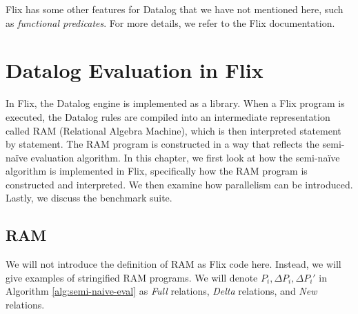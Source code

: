 \documentclass[11pt]{report}
\theoremstyle{definition}
\begin{document}
Flix has some other features for Datalog that we have not mentioned here, such as \textit{functional predicates}. For more details, we refer to the Flix documentation.


\chapter{Datalog Evaluation in Flix}
\label{ch:datalog_evaluation}

In Flix, the Datalog engine is implemented as a library. When a Flix program is executed, the Datalog rules are compiled into an intermediate representation called RAM (Relational Algebra Machine), which is then interpreted statement by statement. The RAM program is constructed in a way that reflects the semi-naïve evaluation algorithm. In this chapter, we first look at how the semi-naïve algorithm is implemented in Flix, specifically how the RAM program is constructed and interpreted. We then examine how parallelism can be introduced. Lastly, we discuss the benchmark suite.

\section{RAM}

We will not introduce the definition of RAM as Flix code here. Instead, we will give examples of stringified RAM programs. We will denote $P_i, \Delta P_i, \Delta P_i'$ in Algorithm \ref{alg:semi-naive-eval} as \textit{Full} relations, \textit{Delta} relations, and \textit{New} relations.
\end{document}
